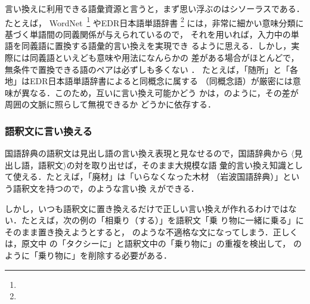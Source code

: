 言い換えに利用できる語彙資源と言うと，まず思い浮ぶのはシソーラスである．
たとえば，
WordNet~\cite{WN:90}\footnote{} 
やEDR日本語単語辞書
\cite{EDR:95}\footnote{}
には，非常に細かい意味分類に基づく単語間の同義関係が与えられているので，
それを用いれば，入力中の単語を同義語に置換する語彙的言い換えを実現でき
るように思える．しかし，実際には同義語といえども意味や用法になんらかの
差がある場合がほとんどで，無条件で置換できる語のペアは必ずしも多くない
\cite{edmonds:99,fujita:01,lapata:01:b,pearce:01,okamoto:03:b,inkpen:03:b} 
．
たとえば，「随所」と「各地」はEDR日本語単語辞書によると同概念に属する
（同概念語）が厳密には意味が異なる．このため，互いに言い換え可能かどう
かは，のように，その差が周囲の文脈に照らして無視できるか
どうかに依存する．

\subsubsection{語釈文に言い換える}

国語辞典の語釈文は見出し語の言い換え表現と見なせるので，国語辞典から
$\langle$見出し語，語釈文$\rangle$の対を取り出せば，そのまま大規模な語
彙的言い換え知識として使える．たとえば，「廃材」は「いらなくなった木材
（岩波国語辞典）」という語釈文を持つので，のような言い換
えができる．

しかし，いつも語釈文に置き換えるだけで正しい言い換えが作れるわけではな
い．たとえば，次の例の「相乗り（する）」を語釈文「乗
り物に一緒に乗る」にそのまま置き換えようとすると，
のような不適格な文になってしまう．正しくは，原文中
の「タクシーに」と語釈文中の「乗り物に」の重複を検出して，
のように「乗り物に」を削除する必要がある．

